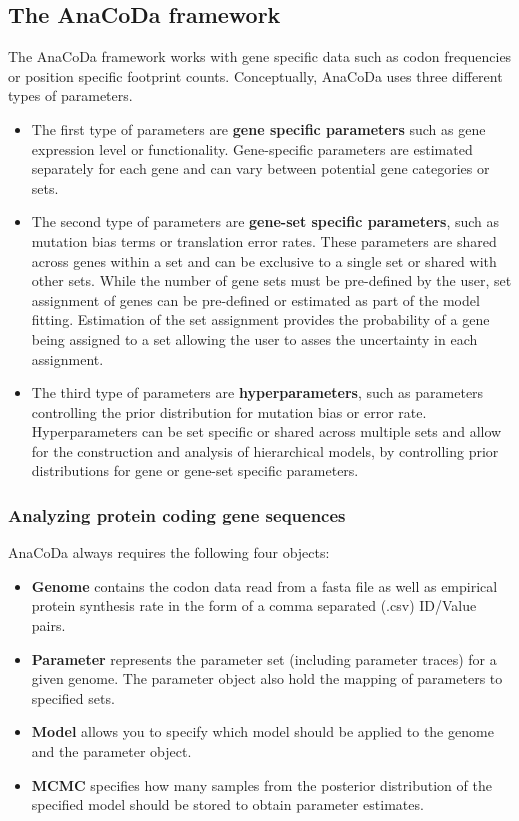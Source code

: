 \subsection{The AnaCoDa framework}
The AnaCoDa framework works with gene specific data such as codon frequencies or position specific footprint
counts. Conceptually, AnaCoDa uses three different types of parameters.

\begin{itemize}
	\item The first type of parameters are \textbf{gene specific parameters} such as gene expression level or functionality.
Gene-specific parameters are estimated separately for each gene and can vary between potential gene
categories or sets.
	\item The second type of parameters are \textbf{gene-set specific parameters}, such as mutation bias terms or
translation error rates. These parameters are shared across genes within a set and can be exclusive to a
single set or shared with other sets. While the number of gene sets must be pre-defined by the user, set
assignment of genes can be pre-defined or estimated as part of the model fitting. Estimation of the set
assignment provides the probability of a gene being assigned to a set allowing the user to asses the
uncertainty in each assignment.
	\item The third type of parameters are \textbf{hyperparameters}, such as parameters controlling the prior distribution
for mutation bias or error rate. Hyperparameters can be set specific or shared across multiple sets
and allow for the construction and analysis of hierarchical models, by controlling prior distributions for
gene or gene-set specific parameters.
\end{itemize}

\subsubsection{Analyzing protein coding gene sequences}
AnaCoDa always requires the following four objects:
\begin{itemize}
	\item \textbf{Genome} contains the codon data read from a fasta file as well as empirical protein synthesis rate in
the form of a comma separated (.csv) ID/Value pairs.
	\item \textbf{Parameter} represents the parameter set (including parameter traces) for a given genome. The
parameter object also hold the mapping of parameters to specified sets.
	\item \textbf{Model} allows you to specify which model should be applied to the genome and the parameter object.
	\item \textbf{MCMC} specifies how many samples from the posterior distribution of the specified model should be
stored to obtain parameter estimates.
\end{itemize}

